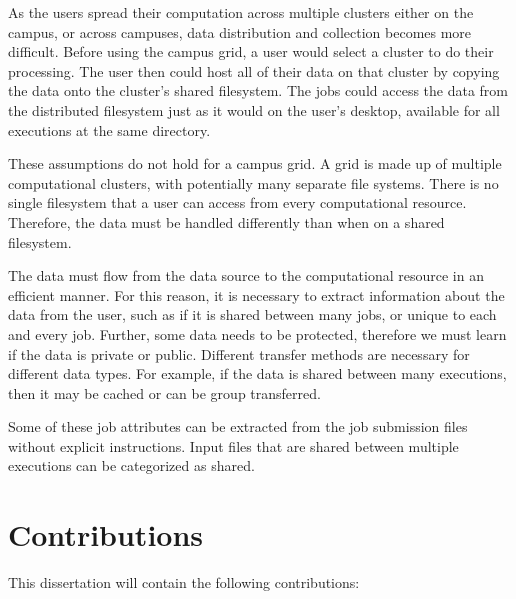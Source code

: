 As the users spread their computation across multiple clusters either on the campus, or across campuses, data distribution and collection becomes more difficult.  Before using the campus grid, a user would select a cluster to do their processing.  The user then could host all of their data on that cluster by copying the data onto the cluster's shared filesystem.  The jobs could access the data from the distributed filesystem just as it would on the user's desktop, available for all executions at the same directory.


These assumptions do not hold for a campus grid.  A grid is made up of multiple computational clusters, with potentially many separate file systems.  There is no single filesystem that a user can access from every computational resource.  Therefore, the data must be handled differently than when on a shared filesystem.  

The data must flow from the data source to the computational resource in an efficient manner.  For this reason, it is necessary to extract information about the data from the user, such as if it is shared between many jobs, or unique to each and every job.  Further, some data needs to be protected, therefore we must learn if the data is private or public.  Different transfer methods are necessary for different data types.  For example, if the data is shared between many executions, then it may be cached or can be group transferred.  

Some of these job attributes can be extracted from the job submission files without explicit instructions.  Input files that are shared between multiple executions can be categorized as shared.

\section{Contributions}

This dissertation will contain the following contributions:


